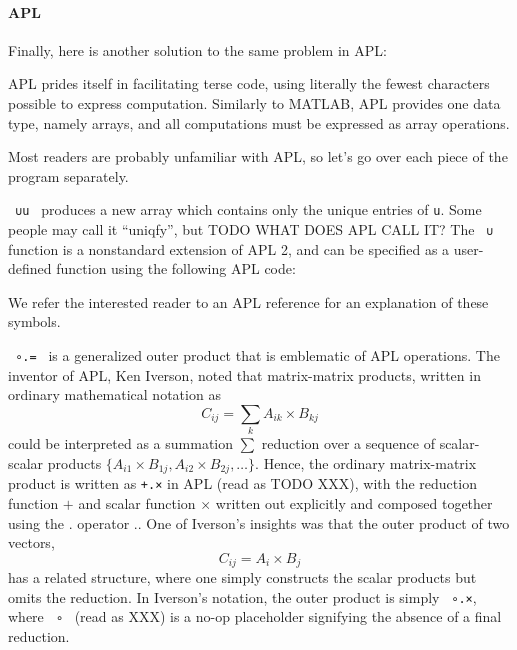 \documentclass[fleqn,10pt,lineno]{wlpeerj} %
\begin{document}
\paragraph{APL}
Finally, here is another solution to the same problem in APL:



APL prides itself in facilitating terse code, using literally the fewest
characters possible to express computation. Similarly to MATLAB, APL provides
one data type, namely arrays, and all computations must be expressed as array
operations.

Most readers are probably unfamiliar with APL, so let's go over each piece of the program separately.

\lstinline| ∪u | produces a new array which contains only the unique entries of
\lstinline|u|. Some people may call it ``uniqfy'', but TODO WHAT DOES APL CALL
IT?
The \lstinline| ∪ | function is a nonstandard extension of APL
2, and can be specified as a user-defined function using the following APL code:
%

%
We refer the interested reader to an APL reference for an explanation of these
symbols.

\lstinline| ∘.= | is a generalized outer product that is emblematic of APL
operations. The inventor of APL, Ken Iverson, noted that matrix-matrix
products, written in ordinary mathematical notation as
\[
C_{ij} = \sum_k A_{ik} \times B_{kj}
\]
%
could be interpreted as a summation $\sum$ reduction over a sequence of
scalar-scalar products $\{A_{i1}\times B_{1j}, A_{i2}\times B_{2j}, \dots\}$.
Hence, the ordinary matrix-matrix product is written as \lstinline|+.×| in APL
(read as TODO XXX), with the reduction function $+$ and scalar function
$\times$ written out explicitly and composed together using the $.$ operator
$.$. One of Iverson's insights was that the outer product of two vectors,
\[
C_{ij} = A_i \times B_j
\]
%
has a related structure, where one simply constructs the scalar products
but omits the reduction. In Iverson's notation, the outer product is simply
\lstinline| ∘.×|, where \lstinline| ∘ | (read as XXX) is a no-op placeholder
signifying the absence of a final reduction.
\end{document}
